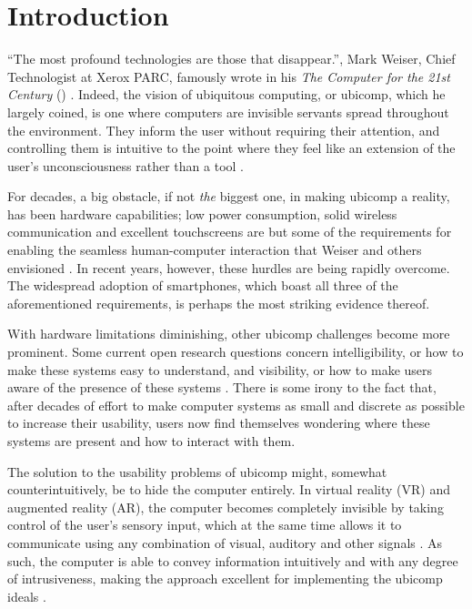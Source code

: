 \documentclass[a4paper,fancychapters]{article}
\begin{document}
	
\section{Introduction} \label{sec:introduction}
``The most profound technologies are those that disappear.'', Mark Weiser, Chief Technologist at Xerox PARC, famously wrote in his \textit{The Computer for the 21st Century} (\citeyear{weiser1991computer}) \cite{weiser1991computer}. Indeed, the vision of ubiquitous computing, or ubicomp, which he largely coined, is one where computers are invisible servants spread throughout the environment. They inform the user without requiring their attention, and controlling them is intuitive to the point where they feel like an extension of the user's unconsciousness rather than a tool \cite{weiser1997coming}. 

For decades, a big obstacle, if not \textit{the} biggest one, in making ubicomp a reality, has been hardware capabilities; low power consumption, solid wireless communication and excellent touchscreens are but some of the requirements for enabling the seamless human-computer interaction that Weiser and others envisioned \cite{weiser1993some}. In recent years, however, these hurdles are being rapidly overcome. The widespread adoption of smartphones, which boast all three of the aforementioned requirements, is perhaps the most striking evidence thereof.

With hardware limitations diminishing, other ubicomp challenges become more prominent. Some current open research questions concern intelligibility, or how to make these systems easy to understand, and visibility, or how to make users aware of the presence of these systems \cite{vermeulen2009bet,vermeulen2013intelligibility}. There is some irony to the fact that, after decades of effort to make computer systems as small and discrete as possible to increase their usability, users now find themselves wondering where these systems are present and how to interact with them.

The solution to the usability problems of ubicomp might, somewhat counterintuitively, be to hide the computer entirely. In virtual reality (VR) and augmented reality (AR), the computer becomes completely invisible by taking control of the user's sensory input, which at the same time allows it to communicate using any combination of visual, auditory and other signals \cite{rheingold1991virtual}. As such, the computer is able to convey information intuitively and with any degree of intrusiveness, making the approach excellent for implementing the ubicomp ideals \cite{weiser1993some}. 
\end{document}
